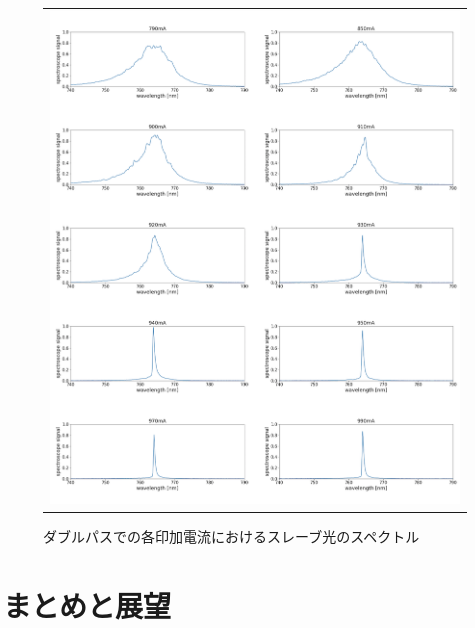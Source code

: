 \documentclass[uplatex, dvipdfmx, a4paper, report, papersize, 11pt]{jsbook}
\begin{document}
\begin{figure}[htpb]
\begin{tabular}{c}
      \begin{minipage}{1\hsize}
        \centering
          \includegraphics[keepaspectratio,  scale=0.340,  angle=0]
                          {figures/chapter4/double-pass-Slave-Spectrum.png}
                          \caption{ダブルパスでの各印加電流におけるスレーブ光のスペクトル}
                          \label{double-pass_I-Slave}

      \end{minipage}


    \end{tabular}
\end{figure}



\chapter{まとめと展望}







\end{document}
